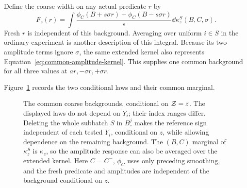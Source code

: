 Define the coarse width on any actual predicate $r$ by
\begin{equation}\label{eq:coarse-width}
 F_z(r)=\int\frac{\phi_C(B+s\sigma r)-\phi_C(B-s\sigma r)}s
                       \dd\kappa_z^S(B,C,\sigma).
\end{equation}
Fresh $r$ is independent of this background. Averaging over uniform
$i\in S$ in the ordinary experiment is another description of this
integral. Because its two amplitude terms ignore $\sigma$, the same
extended kernel also represents Equation~\ref{eq:common-amplitude-kernel}.
This supplies one common background for all three values at
$ar,-\sigma r,+\sigma r$.

Figure~\ref{fig:conditional-kernels} records the two conditional laws
and their common marginal.

\begin{figure}[tbp]
\centering
{}
\caption{The common coarse backgrounds, conditional on $\mathcal Z=z$.
The displayed laws do not depend on $Y_i$; their index ranges differ.
Deleting the whole subbatch $S$ in $B_\circ^j$ makes the reference
sign independent of each tested $Y_i$, conditional on $z$, while
allowing dependence on the remaining background. The $(B,C)$ marginal
of $\kappa_z^S$ is $\kappa_z$, so the amplitude response can also be
averaged over the extended kernel. Here $C=C^-$, $\phi_C$ uses only
preceding smoothing, and the fresh predicate and amplitudes are
independent of the background conditional on $z$.}
\label{fig:conditional-kernels}
\end{figure}

